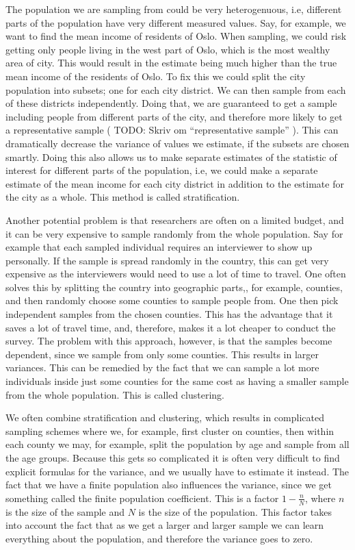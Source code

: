 \documentclass{article}
\begin{document}
The population we are sampling from could be very heterogenuous, i.e, different
parts of the population have very different measured values. Say, for example, we want
to find the mean income of residents of Oslo. When sampling, we could risk
getting only people living in the west part of Oslo, which is the most wealthy
area of city. This would result in the estimate being much higher than the true
mean income of the residents of Oslo. To fix this we could split
the city population into subsets; one for each city district. We can then sample
from each of these districts independently. Doing that, we are guaranteed to get
a sample including people from different parts of the city, and therefore
more likely to get a representative sample ( TODO: Skriv om ``representative
sample'' ). This can dramatically decrease the
variance of values we estimate, if the subsets are chosen smartly. Doing this also allows us to make
separate estimates of the statistic of interest for different parts of the
population, i.e, we could make a separate estimate of the mean income for each city
district in addition to the estimate for the city as a whole. This method is
called stratification.

Another potential problem is that researchers are often on a limited budget, and
it can be very expensive to sample randomly from the whole population. Say
for example that 
each sampled individual requires an interviewer to show up personally. If the sample is spread randomly in the country, this can get very
expensive as the interviewers would need to use a lot of time to travel. One often solves
this by splitting the country into geographic parts,, for example, counties, and
then randomly choose some counties to sample people from. One then pick
independent samples from the chosen counties. This has the advantage that it
saves a lot of travel time, and, therefore, makes it a lot cheaper to conduct the
survey. The problem with this approach, however, is that the samples become
dependent, since we sample from only some counties. This results in larger
variances. This can be remedied by the fact that we can sample a lot more
individuals inside just some counties for the same
cost as having a smaller sample from the whole
population. This is called clustering.

We often combine stratification and clustering, which results in complicated
sampling schemes where we, for example, first cluster on counties, then within
each county we may, for example, split the population by age and sample from all
the age groups. Because this gets so complicated it is often very difficult to
find explicit formulas for the variance, and we usually have to estimate it
instead. 
The fact that we have a finite population also influences the variance, since we
get something called the finite population coefficient. This is a factor \(1 -
\frac{n}{N}\), where \(n\) is the size of the sample and \(N\) is the size of
the population. This factor takes into account the fact that as we get a larger
and larger sample we can learn everything about the population, and therefore
the variance goes to zero.
\end{document}
